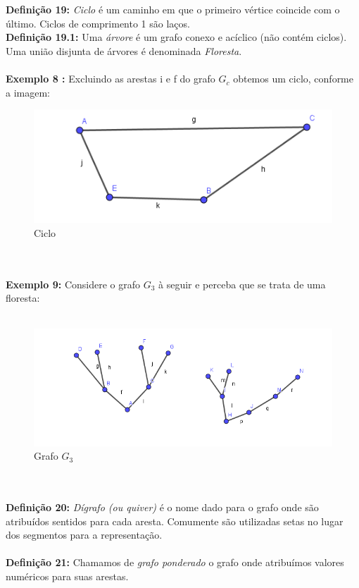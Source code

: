 \documentclass[a4paper,12pt]{article}
\begin{document}
	\\
	\\
	\textbf{Definição 19: }\textit{Ciclo} é um caminho em que o primeiro vértice coincide com o último. Ciclos de comprimento 1 são laços.
	\\
	\textbf{Definição 19.1: }Uma \textit{árvore} é um grafo conexo e acíclico (não contém ciclos). Uma união disjunta de árvores é denominada \textit{Floresta}.
	\\
	\\
	\textbf{Exemplo 8 : }Excluindo as arestas i e f do grafo $G_c$ obtemos um ciclo, conforme a imagem:
	\vspace{0.5cm}
	\begin{figure}[h]
		\center
		\includegraphics[width=0.6\linewidth]{circuitoeuleriano.png}
		\caption{Ciclo}
		\label{}
	\end{figure}
	\\
	\\
	\textbf{Exemplo 9: }Considere o grafo $G_3$ à seguir e perceba que se trata de uma floresta:
	\\
	\\
	\begin{figure}[h]
		\center
		\includegraphics[width=0.7\linewidth]{floresta.png}
		\caption{Grafo $G_3$}
		\label{}
	\end{figure}
	\\
	\\
	\textbf{Definição 20: }\textit{Dígrafo (ou quiver)} é o nome dado para o grafo onde são atribuídos sentidos para cada aresta. Comumente são utilizadas setas no lugar dos segmentos para a representação.
	\\
	\\
	\textbf{Definição 21: }Chamamos de \textit{grafo ponderado} o grafo onde atribuímos valores numéricos para suas arestas.
\end{document}
